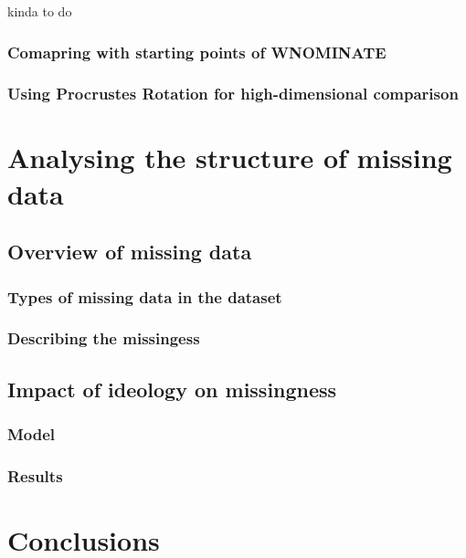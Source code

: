\documentclass{report}
\begin{document}
            kinda to do

            \subsection{Comapring with starting points of WNOMINATE}

            \subsection{Using Procrustes Rotation for high-dimensional comparison}


    \chapter{Analysing the structure of missing data}


        \section{Overview of missing data}

            \subsection{Types of missing data in the dataset}

            \subsection{Describing the missingess}


        \section{Impact of ideology on missingness}

            \subsection{Model}

            \subsection{Results}


    \chapter{Conclusions}
\end{document}
